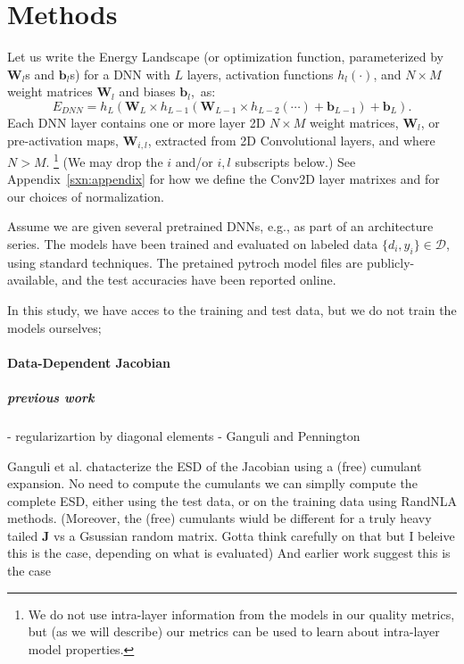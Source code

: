 \section{Methods}
\label{sxn:methods}

Let us write the Energy Landscape (or optimization function, parameterized by $\mathbf{W}_{l}$s and $\mathbf{b}_{l}$s) for a DNN with $L$ layers, activation functions $h_{l}(\cdot)$, and $N\times M$ weight matrices $\mathbf{W}_{l}$ and biases $\mathbf{b}_{l}$,~as:
\begin{equation}
E_{DNN}=h_{L}(\mathbf{W}_{L}\times h_{L-1}(\mathbf{W}_{L-1}\times h_{L-2}(\cdots)+\mathbf{b}_{L-1})+\mathbf{b}_{L})  .
\label{eqn:dnn_energy}
\end{equation}
Each DNN layer contains one or more layer 2D  $N\times M$ weight matrices, $\mathbf{W}_{l}$, or pre-activation maps, $\mathbf{W}_{i,l}$, extracted from 2D Convolutional layers, and where $N > M$.%
\footnote{We do not use intra-layer information from the models in our quality metrics, but (as we will describe) our metrics can be used to learn about intra-layer model properties.}
(We may drop the $i$ and/or $i,l$ subscripts below.)
See Appendix~\ref{sxn:appendix} for how we define the Conv2D layer matrixes and for our choices of normalization. 

Assume we are given several pretrained DNNs, e.g., as part of an architecture series.
The models have been trained and evaluated on labeled data $\{d_{i},y_{i}\}\in\mathcal{D}$, using standard techniques.  
The pretained pytroch model files are publicly-available, and the test accuracies have been reported online.  

In this study, we have acces to the training and test data, but we do not train the models ourselves;



\paragraph{Data-Dependent Jacobian}

\subparagraph{previous work}
- regularizartion by diagonal elements
- Ganguli and Pennington

Ganguli et al. chatacterize the ESD of the Jacobian using a (free) cumulant expansion.
No need to compute the cumulants we can simplly compute the complete ESD, 
either using the test data, or on the training data using RandNLA methods.
(Moreover, the (free) cumulants wiuld be different for a truly heavy tailed $\mathbf{J}$ vs a Gsussian random matrix.
Gotta think carefully on that but I beleive this is the case, depending on what is evaluated)
And earlier work suggest this is the case

